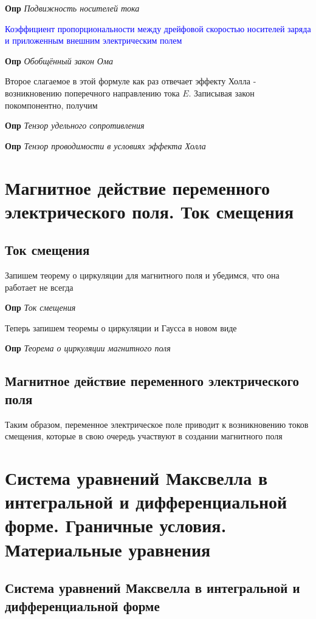 \documentclass[a4paper, 14pt]{article}
\begin{document}
    \textbf{Опр} \textit{Подвижность носителей тока}
    
    \textcolor{blue}{Коэффициент пропорциональности между дрейфовой скоростью носителей заряда и приложенным внешним
    электрическим полем}
    
    \textbf{Опр} \textit{Обобщённый закон Ома}
    
    Второе слагаемое в этой формуле как раз отвечает эффекту Холла - возникновению поперечного направлению тока $E$.
    Записывая закон покомпонентно, получим
    
    \textbf{Опр} \textit{Тензор удельного сопротивления}
    
    \textbf{Опр} \textit{Тензор проводимости в условиях эффекта Холла}
    
    \section{Магнитное действие переменного электрического поля.
    Ток смещения}
    
    \subsection{Ток смещения}
    
    Запишем теорему о циркуляции для магнитного поля и убедимся, что она работает не всегда
    
    \textbf{Опр} \textit{Ток смещения}
    
    Теперь запишем теоремы о циркуляции и Гаусса в новом виде
    
    \textbf{Опр} \textit{Теорема о циркуляции магнитного поля}
    
    \subsection{Магнитное действие переменного электрического поля}
    
    Таким образом, переменное электрическое поле приводит к возникновению токов смещения, которые в свою очередь
    участвуют в создании магнитного поля
    
    \section{Система уравнений Максвелла в интегральной и дифференциальной форме.
    Граничные условия.
    Материальные уравнения}
    
    \subsection{Система уравнений Максвелла в интегральной и дифференциальной форме}
    
\end{document}
